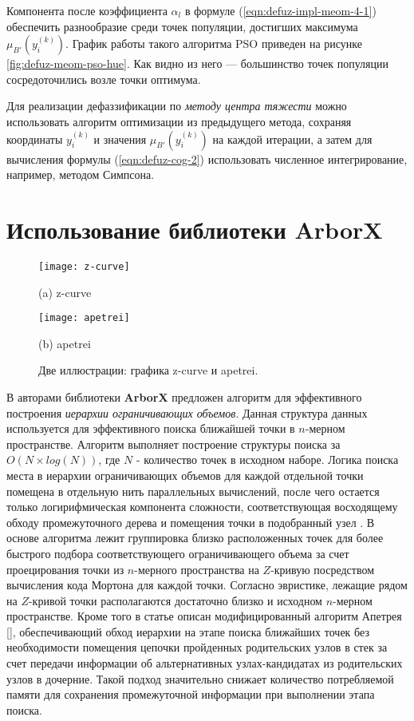 Компонента после коэффициента $\alpha_l$ в формуле (\ref{eqn:defuz-impl-meom-4-1}) обеспечить разнообразие среди точек популяции, достигших максимума $\mu_{B'}(y_i^{(k)})$. График работы такого алгоритма PSO приведен на рисунке \cref{fig:defuz-meom-pso-hue}. Как видно из него --- большинство точек популяции сосредоточились возле точки оптимума.

Для реализации дефаззификации по \textit{методу центра тяжести} можно использовать алгоритм оптимизации из предыдущего метода, сохраняя координаты $y_i^{(k)}$ и значения $\mu_{B'}(y_i^{(k)})$ на каждой итерации, а затем для вычисления формулы (\ref{eqn:defuz-cog-2}) использовать численное интегрирование, например, методом Симпсона.

\section{Использование библиотеки ArborX}\label{sec:ch3/sect2}

\begin{figure}[hbt]
	\label{fig:z-curve-apetrei}
	\centering
	\begin{minipage}[b]{0.45\textwidth}
		\centering
		\texttt{[image: z-curve]}
		\caption*{(a) z-curve}
	\end{minipage}\hfill
	\begin{minipage}[b]{0.45\textwidth}
		\centering
		\texttt{[image: apetrei]}
		\caption*{(b) apetrei}
	\end{minipage}
	\caption{Две иллюстрации: графика z-curve и apetrei.}
\end{figure}

В \cite{prokopenko2024revisingapetreisboundingvolume} авторами библиотеки \textbf{ArborX} предложен алгоритм для эффективного построения \textit{иерархии ограничивающих объемов}. Данная структура данных используется для эффективного поиска ближайшей точки в $n$-мерном пространстве. Алгоритм выполняет построение структуры поиска за $O(N\times log(N))$, где $N$ - количество точек в исходном наборе. Логика поиска места в иерархии ограничивающих объемов для каждой отдельной точки помещена в отдельную нить параллельных вычислений, после чего остается только логирифмическая компонента сложности, соответствующая восходящему обходу промежуточного дерева и помещения точки в подобранный узел . В основе алгоритма лежит группировка близко расположенных точек для более быстрого подбора соответствующего ограничивающего объема за счет проецирования точки из $n$-мерного пространства на $Z$-кривую посредством вычисления кода Мортона для каждой точки. Согласно эвристике, лежащие рядом на $Z$-кривой точки располагаются достаточно близко и исходном $n$-мерном пространстве. Кроме того в статье описан модифицированный алгоритм Апетрея [], обеспечивающий обход иерархии на этапе поиска ближайших точек без необходимости помещения цепочки пройденных родительских узлов в стек за счет передачи информации об альтернативных узлах-кандидатах из родительских узлов в дочерние. Такой подход значительно снижает количество потребляемой памяти для сохранения промежуточной информации при выполнении этапа поиска.


